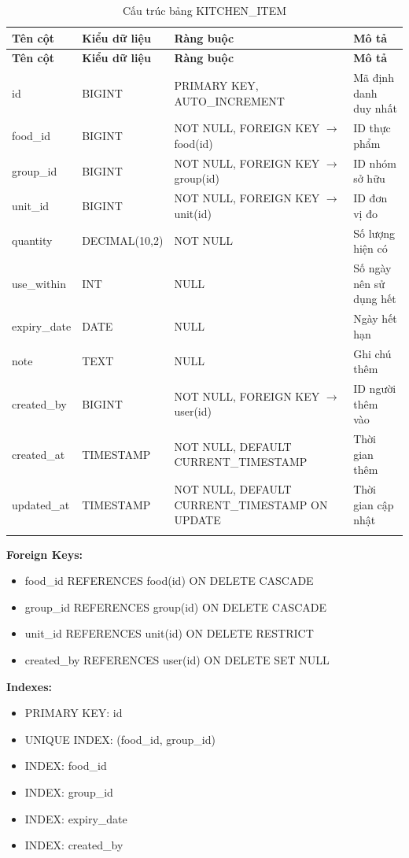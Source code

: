 \small
\begin{longtable}{|>{\raggedright\arraybackslash}p{3.5cm}|>{\raggedright\arraybackslash}p{3cm}|>{\raggedright\arraybackslash}p{4cm}|>{\raggedright\arraybackslash}p{4cm}|}
\hline
\textbf{Tên cột} & \textbf{Kiểu dữ liệu} & \textbf{Ràng buộc} & \textbf{Mô tả} \\
\hline
\endfirsthead
\hline
\textbf{Tên cột} & \textbf{Kiểu dữ liệu} & \textbf{Ràng buộc} & \textbf{Mô tả} \\
\hline
\endhead
id & BIGINT & PRIMARY KEY, AUTO\_INCREMENT & Mã định danh duy nhất \\
\hline
food\_id & BIGINT & NOT NULL, FOREIGN KEY $\rightarrow$ food(id) & ID thực phẩm \\
\hline
group\_id & BIGINT & NOT NULL, FOREIGN KEY $\rightarrow$ group(id) & ID nhóm sở hữu \\
\hline
unit\_id & BIGINT & NOT NULL, FOREIGN KEY $\rightarrow$ unit(id) & ID đơn vị đo \\
\hline
quantity & DECIMAL(10,2) & NOT NULL & Số lượng hiện có \\
\hline
use\_within & INT & NULL & Số ngày nên sử dụng hết \\
\hline
expiry\_date & DATE & NULL & Ngày hết hạn \\
\hline
note & TEXT & NULL & Ghi chú thêm \\
\hline
created\_by & BIGINT & NOT NULL, FOREIGN KEY $\rightarrow$ user(id) & ID người thêm vào \\
\hline
created\_at & TIMESTAMP & NOT NULL, DEFAULT CURRENT\_TIMESTAMP & Thời gian thêm \\
\hline
updated\_at & TIMESTAMP & NOT NULL, DEFAULT CURRENT\_TIMESTAMP ON UPDATE & Thời gian cập nhật \\
\hline
\caption{Cấu trúc bảng KITCHEN\_ITEM}
\end{longtable}

\textbf{Foreign Keys:}
\begin{itemize}
    \item food\_id REFERENCES food(id) ON DELETE CASCADE
    \item group\_id REFERENCES group(id) ON DELETE CASCADE
    \item unit\_id REFERENCES unit(id) ON DELETE RESTRICT
    \item created\_by REFERENCES user(id) ON DELETE SET NULL
\end{itemize}

\textbf{Indexes:}
\begin{itemize}
    \item PRIMARY KEY: id
    \item UNIQUE INDEX: (food\_id, group\_id)
    \item INDEX: food\_id
    \item INDEX: group\_id
    \item INDEX: expiry\_date
    \item INDEX: created\_by
\end{itemize}

